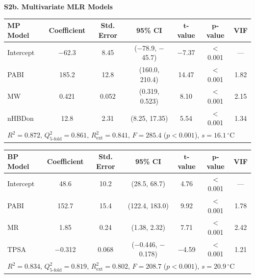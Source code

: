 \documentclass[12pt,a4paper]{article}
\begin{document}
\noindent\textbf{S2b. Multivariate MLR Models}

\vspace{0.3cm}

\begin{table}[H]
\centering
\begin{tabular}{@{}lcccccc@{}}
\toprule
\textbf{MP Model} & \textbf{Coefficient} & \textbf{Std. Error} & \textbf{95\% CI} & $\mathbf{t}$-\textbf{value} & $\mathbf{p}$-\textbf{value} & \textbf{VIF} \\
\midrule
Intercept & $-$62.3 & 8.45 & ($-$78.9, $-$45.7) & $-$7.37 & $<$0.001 & --- \\
PABI & 185.2 & 12.8 & (160.0, 210.4) & 14.47 & $<$0.001 & 1.82 \\
MW & 0.421 & 0.052 & (0.319, 0.523) & 8.10 & $<$0.001 & 2.15 \\
nHBDon & 12.8 & 2.31 & (8.25, 17.35) & 5.54 & $<$0.001 & 1.34 \\
\midrule
\multicolumn{7}{l}{$R^2 = 0.872$, $Q^2_{5\text{-fold}} = 0.861$, $R^2_{\text{ext}} = 0.841$, $F = 285.4$ ($p < 0.001$), $s = 16.1\,^{\circ}\text{C}$} \\
\bottomrule
\end{tabular}
\end{table}

\vspace{0.3cm}

\begin{table}[H]
\centering
\begin{tabular}{@{}lcccccc@{}}
\toprule
\textbf{BP Model} & \textbf{Coefficient} & \textbf{Std. Error} & \textbf{95\% CI} & $\mathbf{t}$-\textbf{value} & $\mathbf{p}$-\textbf{value} & \textbf{VIF} \\
\midrule
Intercept & 48.6 & 10.2 & (28.5, 68.7) & 4.76 & $<$0.001 & --- \\
PABI & 152.7 & 15.4 & (122.4, 183.0) & 9.92 & $<$0.001 & 1.78 \\
MR & 1.85 & 0.24 & (1.38, 2.32) & 7.71 & $<$0.001 & 2.42 \\
TPSA & $-$0.312 & 0.068 & ($-$0.446, $-$0.178) & $-$4.59 & $<$0.001 & 1.21 \\
\midrule
\multicolumn{7}{l}{$R^2 = 0.834$, $Q^2_{5\text{-fold}} = 0.819$, $R^2_{\text{ext}} = 0.802$, $F = 208.7$ ($p < 0.001$), $s = 20.9\,^{\circ}\text{C}$} \\
\bottomrule
\end{tabular}
\end{table}

\vspace{0.3cm}
\end{document}
